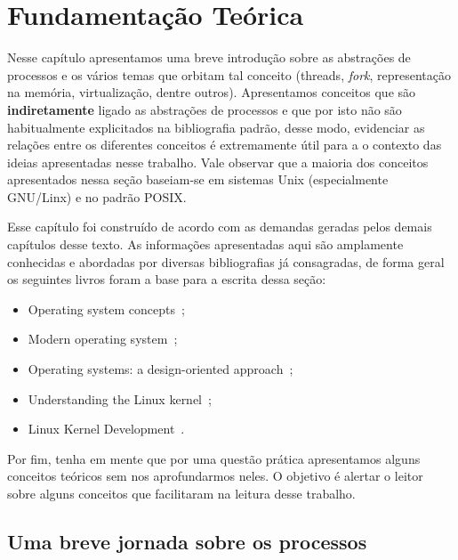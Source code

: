 \chapter{Fundamentação Teórica}

Nesse capítulo apresentamos uma breve introdução sobre as abstrações de
processos e os vários temas que orbitam tal conceito (threads, \emph{fork},
representação na memória, virtualização, dentre outros). Apresentamos conceitos
que são \textbf{indiretamente} ligado as abstrações de processos e que por isto
não são habitualmente explicitados na bibliografia padrão, desse modo,
evidenciar as relações entre os diferentes conceitos é extremamente útil para a
o contexto das ideias apresentadas nesse trabalho. Vale observar que a maioria
dos conceitos apresentados nessa seção baseiam-se em sistemas Unix
(especialmente GNU/Linx) e no padrão POSIX.

Esse capítulo foi construído de acordo com as demandas geradas pelos demais
capítulos desse texto. As informações apresentadas aqui são amplamente
conhecidas e abordadas por diversas bibliografias já consagradas, de forma
geral os seguintes livros foram a base para a escrita dessa seção:

\begin{itemize}
  \item Operating system concepts~\citep{silberschatz};
  \item Modern operating system~\citep{tanenbaum};
  \item Operating systems: a design-oriented approach~\citep{crowley};
  \item Understanding the Linux kernel~\citep{entendendo_kernel};
  \item Linux Kernel Development~\citep{love}.
\end{itemize}

Por fim, tenha em mente que por uma questão prática apresentamos alguns
conceitos teóricos sem nos aprofundarmos neles. O objetivo é alertar o leitor
sobre alguns conceitos que facilitaram na leitura desse trabalho.

\label{cap:fundamentacao-teorica}

\section{Uma breve jornada sobre os processos}
\label{sec:processos-e-threads}

